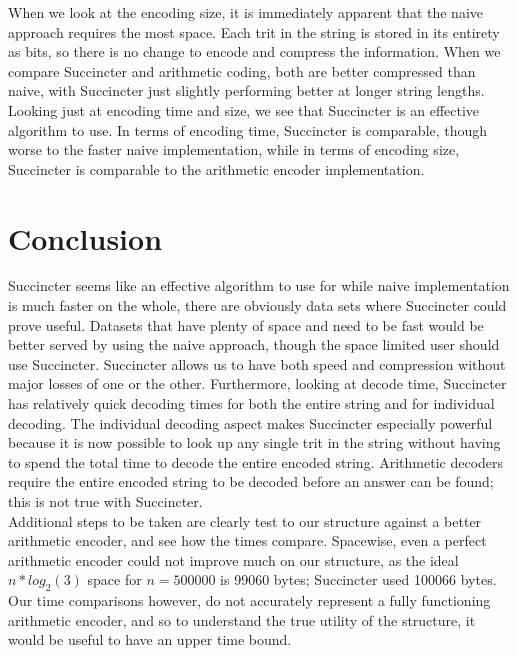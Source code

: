\documentclass{article}
\begin{document}
When we look at the encoding size, it is immediately apparent that the naive approach requires the most space. Each trit in the string is stored in its entirety as bits, so there is no change to encode and compress the information. When we compare Succincter and arithmetic coding, both are better compressed than naive, with Succincter just slightly performing better at longer string lengths. \\

Looking just at encoding time and size, we see that Succincter is an effective algorithm to use. In terms of encoding time, Succincter is comparable, though worse to the faster naive implementation, while in terms of encoding size, Succincter is comparable to the arithmetic encoder implementation. 

\noindent \section{Conclusion}

Succincter seems like an effective algorithm to use for while naive implementation is much faster on the whole, there are obviously data sets where Succincter could prove useful. Datasets that have plenty of space and need to be fast would be better served by using the naive approach, though the space limited user should use Succincter. Succincter allows us to have both speed and compression without major losses of one or the other. Furthermore, looking at decode time, Succincter has relatively quick decoding times for both the entire string and for individual decoding. The individual decoding aspect makes Succincter especially powerful because it is now possible to look up any single trit in the string without having to spend the total time to decode the entire encoded string. Arithmetic decoders require the entire encoded string to be decoded before an answer can be found; this is not true with Succincter.\\

Additional steps to be taken are clearly test to our structure against a better arithmetic encoder, and see how the times compare. Spacewise, even a perfect arithmetic encoder could not improve much on our structure, as the ideal $n*log_2(3)$ space for $n = 500000$ is 99060 bytes; Succincter used 100066 bytes. Our time comparisons however, do not accurately represent a fully functioning arithmetic encoder, and so to understand the true utility of the structure, it would be useful to have an upper time bound.
\end{document}
